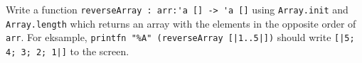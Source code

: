 Write a function \mbox{\lstinline{reverseArray : arr:'a [] -> 'a []}} using \lstinline{Array.init} and \lstinline{Array.length} which returns an array with the elements in the opposite order of \lstinline{arr}.  For eksample, \lstinline{printfn "%A" (reverseArray [|1..5|])} %
 should write \mbox{\lstinline{[|5; 4; 3; 2; 1|]}} to the screen.
